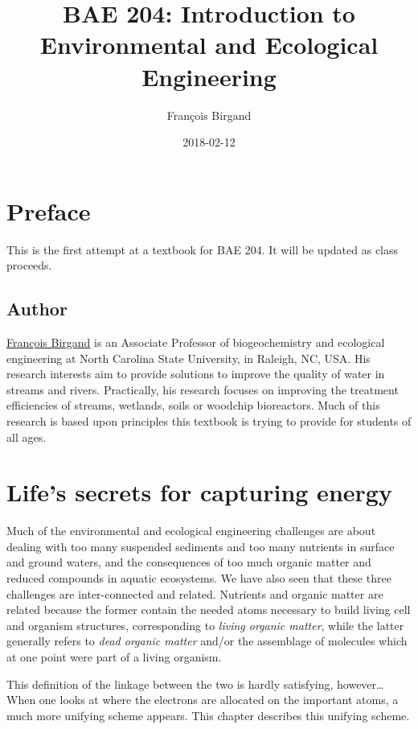 \documentclass[]{book}
\title{BAE 204: Introduction to Environmental and Ecological Engineering}
\author{François Birgand}
\date{2018-02-12}
\theoremstyle{definition}
\theoremstyle{definition}
\theoremstyle{definition}
\theoremstyle{remark}
\begin{document}
\maketitle

{
\setcounter{tocdepth}{1}
\tableofcontents
}
\chapter*{Preface}\label{preface}

This is the first attempt at a textbook for BAE 204. It will be updated
as class proceeds.

\section*{Author}\label{author}

\href{https://francoisbirgand.github.io}{François Birgand} is an
Associate Professor of biogeochemistry and ecological engineering at
North Carolina State University, in Raleigh, NC, USA. His research
interests aim to provide solutions to improve the quality of water in
streams and rivers. Practically, his research focuses on improving the
treatment efficiencies of streams, wetlands, soils or woodchip
bioreactors. Much of this research is based upon principles this
textbook is trying to provide for students of all ages.

\chapter{Life's secrets for capturing
energy}\label{lifes-secrets-for-capturing-energy}

Much of the environmental and ecological engineering challenges are
about dealing with too many suspended sediments and too many nutrients
in surface and ground waters, and the consequences of too much organic
matter and reduced compounds in aquatic ecosystems. We have also seen
that these three challenges are inter-connected and related. Nutrients
and organic matter are related because the former contain the needed
atoms necessary to build living cell and organism structures,
corresponding to \emph{living organic matter}, while the latter
generally refers to \emph{dead organic matter} and/or the assemblage of
molecules which at one point were part of a living organism.

This definition of the linkage between the two is hardly satisfying,
however\ldots{} When one looks at where the electrons are allocated on
the important atoms, a much more unifying scheme appears. This chapter
describes this unifying scheme.
\end{document}
